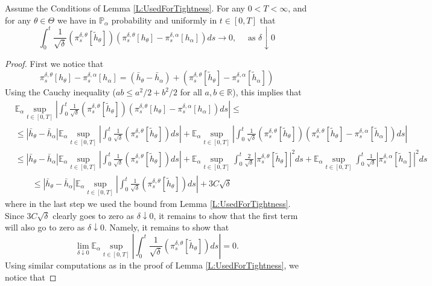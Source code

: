 \documentclass{article}
\begin{document}
\begin{lemma}\label{L:MismatchTerm}
Assume the Conditions of Lemma \ref{L:UsedForTightness}. For any $0<T<\infty$, and for any $\theta\in\Theta$ we have in $\mathbb{P}_{\alpha}$ probability and uniformly in $t\in[0,T]$  that
\[\int_0^t\frac{1}{\sqrt\delta}\left( \pi_s^{\delta,\theta}[\tilde h_{\theta}]\right)\left(\pi_s^{\delta,\theta}[h_{\theta}]-\pi_s^{\delta,\alpha}[h_{\alpha}]\right)ds\rightarrow 0, \quad\text{ as  }\delta \downarrow 0\]
\end{lemma}
\begin{proof}
First we notice that
\[
\pi_s^{\delta,\theta}[h_{\theta}]-\pi_s^{\delta,\alpha}[h_{\alpha}]=\left(\bar{h}_{\theta}-\bar{h}_{\alpha}\right)+\left(\pi_s^{\delta,\theta}[\tilde h_{\theta}]-\pi_s^{\delta,\alpha}[\tilde h_{\alpha}]\right)
\]
Using the Cauchy inequality ($ab\leq a^{2}/2+b^{2}/2$ for all $a,b\in\mathbb R$), this implies that
\begin{align}
&\mathbb{E}_{\alpha}\sup_{t\in[0,T]}\left|\int_0^t\frac{1}{\sqrt\delta}\left( \pi_s^{\delta,\theta}[\tilde h_{\theta}]\right)\left(\pi_s^{\delta,\theta}[h_{\theta}]-\pi_s^{\delta,\alpha}[h_{\alpha}]\right)ds\right|\leq \nonumber\\
&\leq
\left|\bar{h}_{\theta}-\bar{h}_{\alpha}\right|\mathbb{E}_{\alpha}\sup_{t\in[0,T]}\left|\int_0^t\frac{1}{\sqrt\delta}\left( \pi_s^{\delta,\theta}[\tilde h_{\theta}]\right)ds\right|+\mathbb{E}_{\alpha}\sup_{t\in[0,T]}\left|\int_0^t\frac{1}{\sqrt\delta}\left( \pi_s^{\delta,\theta}[\tilde h_{\theta}]\right)\left(\pi_s^{\delta,\theta}[\tilde h_{\theta}]-\pi_s^{\delta,\alpha}[\tilde h_{\alpha}]\right)ds\right|\nonumber\\
&\leq
\left|\bar{h}_{\theta}-\bar{h}_{\alpha}\right|\mathbb{E}_{\alpha}\sup_{t\in[0,T]}\left|\int_0^t\frac{1}{\sqrt\delta}\left( \pi_s^{\delta,\theta}[\tilde h_{\theta}]\right)ds\right|+\mathbb{E}_{\alpha}\sup_{t\in[0,T]}\int_0^t\frac{2}{\sqrt\delta}\left| \pi_s^{\delta,\theta}[\tilde h_{\theta}]\right|^{2}ds
+\mathbb{E}_{\alpha}\sup_{t\in[0,T]}\int_0^t\frac{1}{\sqrt\delta}\left| \pi_s^{\delta,\alpha}[\tilde h_{\alpha}]\right|^{2}ds
\nonumber\\
&\qquad\leq
\left|\bar{h}_{\theta}-\bar{h}_{\alpha}\right|\mathbb{E}_{\alpha}\sup_{t\in[0,T]}\left|\int_0^t\frac{1}{\sqrt\delta}\left( \pi_s^{\delta,\theta}[\tilde h_{\theta}]\right)ds\right|+3C\sqrt{\delta}
\end{align}
where in the last step we used the bound from Lemma  \ref{L:UsedForTightness}. Since $3C\sqrt\delta$ clearly goes to zero as $\delta\downarrow 0$, it remains to show that the first term will also go to zero as $\delta\downarrow 0$. Namely, it remains to show that
\[
\lim_{\delta\downarrow 0}\mathbb{E}_{\alpha}\sup_{t\in[0,T]}\left|\int_0^t\frac{1}{\sqrt\delta}\left( \pi_s^{\delta,\theta}[\tilde h_{\theta}]\right)ds\right|=0.
\]
Using similar computations as in the proof of Lemma \ref{L:UsedForTightness}, we notice that


\end{proof}
\end{document}
